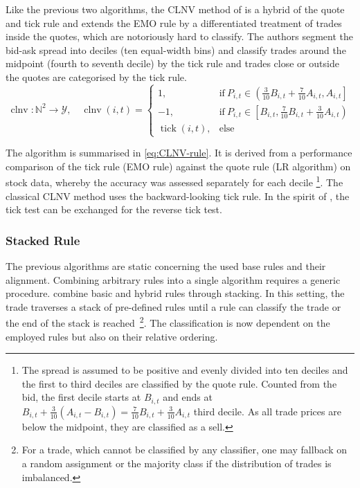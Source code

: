 Like the previous two algorithms, the \gls{CLNV} method of \textcite[][3809]{chakrabartyTradeClassificationAlgorithms2012} is a hybrid of the quote and tick rule and extends the \gls{EMO} rule by a differentiated treatment of trades inside the quotes, which are notoriously hard to classify. The authors segment the bid-ask spread into deciles (ten equal-width bins) and classify trades around the midpoint (fourth to seventh decile) by the tick rule and trades close or outside the quotes are categorised by the tick rule.
\begin{equation}
    \operatorname{clnv} \colon \mathbb{N}^2 \to \mathcal{Y}, \quad
    \operatorname{clnv}(i, t)=
    \begin{cases}
        1,                         & \mathrm{if}\ P_{i, t} \in \left(\frac{3}{10} B_{i,t} + \frac{7}{10} A_{i,t}, A_{i, t}\right] \\
        -1,                        & \mathrm{if}\ P_{i, t} \in \left[ B_{i,t}, \frac{7}{10} B_{i,t} + \frac{3}{10} A_{i,t}\right) \\
        \operatorname{tick}(i, t), & \mathrm{else}
    \end{cases}
    \label{eq:CLNV-rule}
\end{equation}

The algorithm is summarised in \cref{eq:CLNV-rule}. It is derived from a performance comparison of the tick rule (\gls{EMO} rule) against the quote rule (\gls{LR} algorithm) on stock data, whereby the accuracy was assessed separately for each decile \footnote{The spread is assumed to be positive and evenly divided into ten deciles and the first to third deciles are classified by the quote rule. Counted from the bid, the first decile starts at $B_{i,t}$ and ends at $B_{i,t} + \tfrac{3}{10} (A_{i,t} - B_{i,t}) = \tfrac{7}{10} B_{i,t} + \tfrac{3}{10} A_{i,t}$ third decile. As all trade prices are below the midpoint, they are classified as a sell.}. The classical \gls{CLNV} method uses the backward-looking tick rule. In the spirit of \textcite[][735]{leeInferringTradeDirection1991}, the tick test can be exchanged for the reverse tick test.

\subsubsection{Stacked Rule}\label{sec:stacked-rule}

The previous algorithms are static concerning the used base rules and their alignment. Combining arbitrary rules into a single algorithm requires a generic procedure. \textcite[][18]{grauerOptionTradeClassification2022} combine basic and hybrid rules through stacking. In this setting, the trade traverses a stack of pre-defined rules until a rule can classify the trade or the end of the stack is reached~\footnote{For a trade, which cannot be classified by any classifier, one may fallback on a random assignment or the majority class if the distribution of trades is imbalanced.}. The classification is now dependent on the employed rules but also on their relative ordering.

